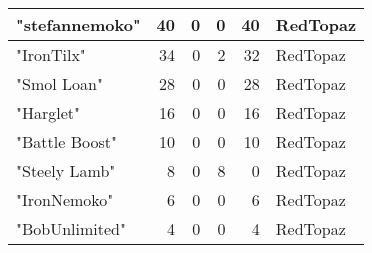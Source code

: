 \documentclass{article}
\begin{document}
\begin{table}[htbp]
\begin{tabular}{|l|r|r|r|r|l|}
"stefannemoko" & 40 & 0 & 0 & 40 & RedTopaz \\ \hline
"IronTilx" & 34 & 0 & 2 & 32 & RedTopaz \\ \hline
"Smol Loan" & 28 & 0 & 0 & 28 & RedTopaz \\ \hline
"Harglet" & 16 & 0 & 0 & 16 & RedTopaz \\ \hline
"Battle Boost" & 10 & 0 & 0 & 10 & RedTopaz \\ \hline
"Steely Lamb" & 8 & 0 & 8 & 0 & RedTopaz \\ \hline
"IronNemoko" & 6 & 0 & 0 & 6 & RedTopaz \\ \hline
"BobUnlimited" & 4 & 0 & 0 & 4 & RedTopaz \\ \hline
\end{tabular}
\end{table}
\end{document}
